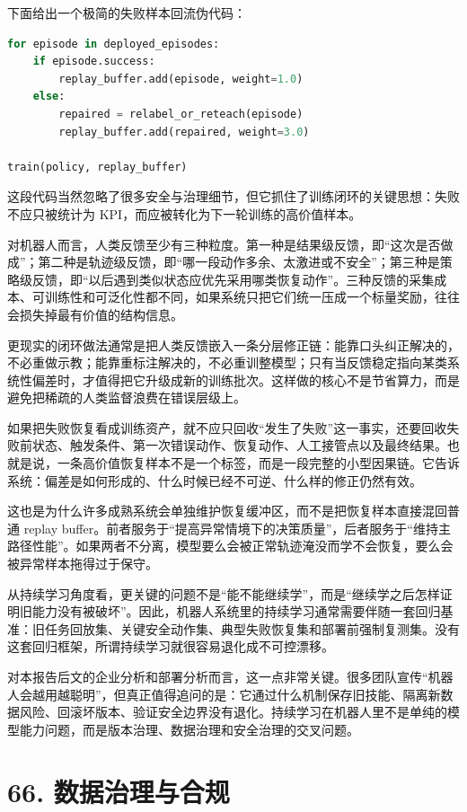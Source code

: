 下面给出一个极简的失败样本回流伪代码：

\begin{lstlisting}[language=python]
for episode in deployed_episodes:
    if episode.success:
        replay_buffer.add(episode, weight=1.0)
    else:
        repaired = relabel_or_reteach(episode)
        replay_buffer.add(repaired, weight=3.0)

train(policy, replay_buffer)
\end{lstlisting}

这段代码当然忽略了很多安全与治理细节，但它抓住了训练闭环的关键思想：失败不应只被统计为 KPI，而应被转化为下一轮训练的高价值样本。

对机器人而言，人类反馈至少有三种粒度。第一种是结果级反馈，即“这次是否做成”；第二种是轨迹级反馈，即“哪一段动作多余、太激进或不安全”；第三种是策略级反馈，即“以后遇到类似状态应优先采用哪类恢复动作”。三种反馈的采集成本、可训练性和可泛化性都不同，如果系统只把它们统一压成一个标量奖励，往往会损失掉最有价值的结构信息。

更现实的闭环做法通常是把人类反馈嵌入一条分层修正链：能靠口头纠正解决的，不必重做示教；能靠重标注解决的，不必重训整模型；只有当反馈稳定指向某类系统性偏差时，才值得把它升级成新的训练批次。这样做的核心不是节省算力，而是避免把稀疏的人类监督浪费在错误层级上。

如果把失败恢复看成训练资产，就不应只回收“发生了失败”这一事实，还要回收失败前状态、触发条件、第一次错误动作、恢复动作、人工接管点以及最终结果。也就是说，一条高价值恢复样本不是一个标签，而是一段完整的小型因果链。它告诉系统：偏差是如何形成的、什么时候已经不可逆、什么样的修正仍然有效。

这也是为什么许多成熟系统会单独维护恢复缓冲区，而不是把恢复样本直接混回普通 replay buffer。前者服务于“提高异常情境下的决策质量”，后者服务于“维持主路径性能”。如果两者不分离，模型要么会被正常轨迹淹没而学不会恢复，要么会被异常样本拖得过于保守。

从持续学习角度看，更关键的问题不是“能不能继续学”，而是“继续学之后怎样证明旧能力没有被破坏”。因此，机器人系统里的持续学习通常需要伴随一套回归基准：旧任务回放集、关键安全动作集、典型失败恢复集和部署前强制复测集。没有这套回归框架，所谓持续学习就很容易退化成不可控漂移。

对本报告后文的企业分析和部署分析而言，这一点非常关键。很多团队宣传“机器人会越用越聪明”，但真正值得追问的是：它通过什么机制保存旧技能、隔离新数据风险、回滚坏版本、验证安全边界没有退化。持续学习在机器人里不是单纯的模型能力问题，而是版本治理、数据治理和安全治理的交叉问题。

\chapter*{66. 数据治理与合规}

